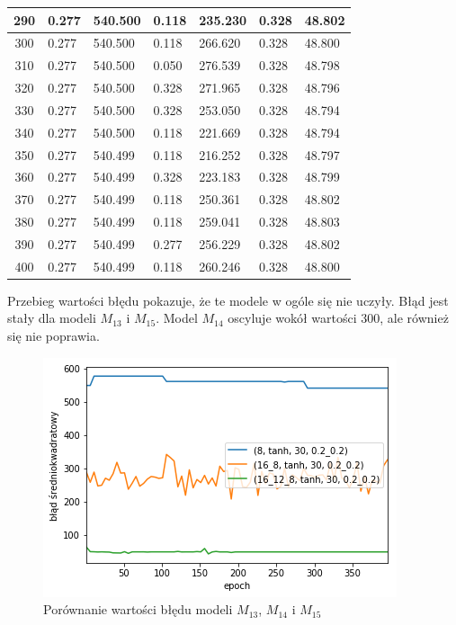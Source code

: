 \documentclass{report}
\begin{document}
\begin{minipage}{\textwidth}
\begin{longtable}{|c|l|l|l|l|l|l|}
                     290 & 0.277 & 540.500 & 0.118 & 235.230 & 0.328 & 48.802 \\ \hline
                     300 & 0.277 & 540.500 & 0.118 & 266.620 & 0.328 & 48.800 \\ \hline
                     310 & 0.277 & 540.500 & 0.050 & 276.539 & 0.328 & 48.798 \\ \hline
                     320 & 0.277 & 540.500 & 0.328 & 271.965 & 0.328 & 48.796 \\ \hline
                     330 & 0.277 & 540.500 & 0.328 & 253.050 & 0.328 & 48.794 \\ \hline
                     340 & 0.277 & 540.500 & 0.118 & 221.669 & 0.328 & 48.794 \\ \hline
                     350 & 0.277 & 540.499 & 0.118 & 216.252 & 0.328 & 48.797 \\ \hline
                     360 & 0.277 & 540.499 & 0.328 & 223.183 & 0.328 & 48.799 \\ \hline
                     370 & 0.277 & 540.499 & 0.118 & 250.361 & 0.328 & 48.802 \\ \hline
                     380 & 0.277 & 540.499 & 0.118 & 259.041 & 0.328 & 48.803 \\ \hline
                     390 & 0.277 & 540.499 & 0.277 & 256.229 & 0.328 & 48.802 \\ \hline
                     400 & 0.277 & 540.499 & 0.118 & 260.246 & 0.328 & 48.800 \\ \hline
                 \end{longtable}
    \end{minipage}


    Przebieg wartości błędu pokazuje, że te modele w ogóle się nie uczyły.
    Błąd jest stały dla modeli $M_{13}$ i $M_{15}$.
    Model $M_{14}$ oscyluje wokół wartości 300, ale również się nie poprawia.

    \begin{figure}[htp]
        \centering
        \includegraphics[scale=0.8]{./img/arch-error-tanh.png}
        \caption{Porównanie wartości błędu modeli $M_{13}$, $M_{14}$ i $M_{15}$}
    \end{figure}
\end{document}
